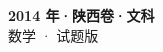 \documentclass[zihao=-4, a4paper]{ctexart}
\begin{document}
\begin{center}
  {\Large\bfseries 2014 年·陕西卷·文科}\\[4pt]
  {\large 数学 · 试题版}
\end{center}
\medskip
{}

\end{document}
